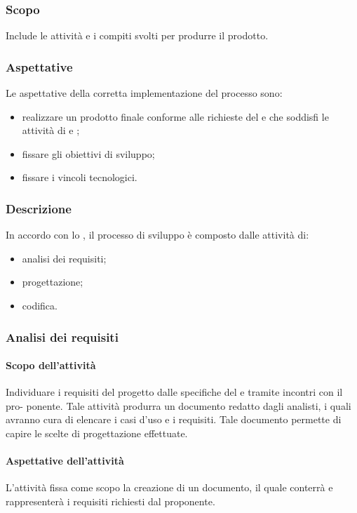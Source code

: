 \subsubsection{Scopo}
Include le attività e i compiti svolti per produrre il prodotto.
\subsubsection{Aspettative}
Le aspettative della corretta implementazione del processo sono:
\begin{itemize}
		\item realizzare un prodotto finale conforme alle richieste del  e che soddisfi le attività di  e ;
		\item fissare gli obiettivi di sviluppo;
		\item fissare i vincoli tecnologici.
\end{itemize}

\subsubsection{Descrizione}
In accordo con lo  , il processo di sviluppo è composto dalle attività di:
\begin{itemize}
		\item analisi dei requisiti;
		\item progettazione;
		\item codifica.
\end{itemize}

\subsubsection{Analisi dei requisiti}
 \paragraph{Scopo dell'attività}
  Individuare i requisiti del progetto dalle specifiche del  e tramite incontri con il pro-
  ponente. Tale attività produrra un documento redatto dagli analisti, i quali avranno cura di elencare i casi d'uso e i requisiti. Tale documento permette di
 capire le scelte di progettazione effettuate.
 \paragraph{Aspettative dell'attività}
 L'attività fissa come scopo la creazione di un documento, il quale conterrà e rappresenterà i requisiti richiesti dal proponente.
